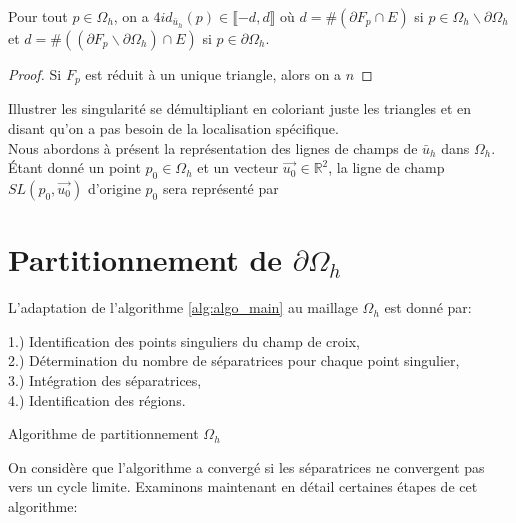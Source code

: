 \begin{proposition}
    Pour tout $p\in\Omega_h$, on a $4id_{\bar{u}_h}(p)\in\llbracket -d, d\rrbracket$ où $d=\#(\partial F_p\cap E)$ si $p\in\Omega_h\backslash\partial\Omega_h$ et $d=\#((\partial F_p\backslash\partial\Omega_h)\cap E)$ si $p\in\partial\Omega_h$.
\end{proposition}

\begin{proof}
    Si $F_p$ est réduit à un unique triangle, alors on a $n$
\end{proof}


Illustrer les singularité se démultipliant  en coloriant juste les triangles et en disant qu'on a pas besoin de la localisation spécifique.\\

Nous abordons à présent la représentation des lignes de champs de $\bar{u}_h$ dans $\Omega_h$. \'Etant donné un point $p_0\in\Omega_h$ et un vecteur $\overrightarrow{u_0}\in\mathbb{R}^2$, la ligne de champ $SL(p_0, \overrightarrow{u_0})$ d'origine $p_0$ sera représenté par 
\section{Partitionnement de $\partial\Omega_h$}

L'adaptation de l'algorithme \ref{alg:algo_main} au maillage $\Omega_h$ est donné par:\\

\begin{algorithm}[H]
\label{alg:discr_algo_main}
\vspace{0.2cm}
1.) Identification des points singuliers du champ de croix,\\\vspace{0.2cm}
2.) Détermination du nombre de séparatrices pour chaque point singulier,\\\vspace{0.2cm}
3.) Intégration des séparatrices,\\\vspace{0.2cm}
4.) Identification des régions.\\\vspace{0.2cm}
\caption{Algorithme de partitionnement $\Omega_h$}
\end{algorithm}
\vspace{0.5cm}
On considère que l'algorithme a convergé si les séparatrices ne convergent pas vers un cycle limite. Examinons maintenant en détail certaines étapes de cet algorithme:

